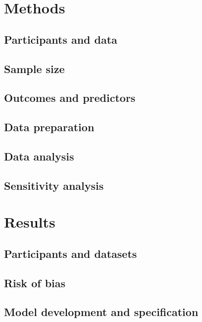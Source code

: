 \documentclass[
  letterpaper,
  DIV=11,
  numbers=noendperiod]{scrartcl}
\begin{document}
\section{Methods}\label{methods}

\subsection{Participants and data}\label{participants-and-data}

\subsection{Sample size}\label{sample-size}

\subsection{Outcomes and predictors}\label{outcomes-and-predictors}

\subsection{Data preparation}\label{data-preparation}

\subsection{Data analysis}\label{data-analysis}

\subsection{Sensitivity analysis}\label{sensitivity-analysis}

\section{Results}\label{results}

\subsection{Participants and datasets}\label{participants-and-datasets}

\subsection{Risk of bias}\label{risk-of-bias}

\subsection{Model development and
specification}\label{model-development-and-specification}
\end{document}
